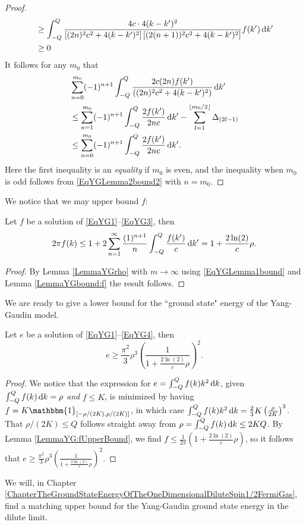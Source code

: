 \begin{proof}
\begin{equation}
\begin{aligned}
&\geq \int_{-Q}^{Q}\frac{4c\cdot 4(k-k')^2}{\left[(2n)^2c^2+4(k-k')^2\right]\left[(2(n+1))^2c^2+4(k-k')^2\right]} f(k')\mathop{}\!\mathrm{d} k'\\
&\geq 0
\end{aligned}
\end{equation}
It follows for any $ m_0 $ that \begin{equation}
\begin{aligned}
&\sum_{n=0}^{m_0}(-1)^{n+1}\int_{-Q}^{Q}\frac{2c(2n) f(k')}{((2n)^2c^2+4(k-k')^2)}\mathop{}\!\mathrm{d} k'\\
&\leq\sum_{n=1}^{m_0}(-1)^{n+1}\int_{-Q}^{Q}\frac{2 f(k')}{2nc}\mathop{}\!\mathrm{d} k'-\sum_{l=1}^{\left\lfloor m_0/2 \right\rfloor}\Delta_{(2l-1)}
\\
&\leq \sum_{n=0}^{m_0}(-1)^{n+1}\int_{-Q}^{Q}\frac{2 f(k')}{2nc}\mathop{}\!\mathrm{d} k'.
\end{aligned}
\end{equation}
Here the first inequality is an \emph{equality} if $ m_0 $ is even, and the inequality when $ m_0 $ is odd follows from \eqref{EqYGLemma2bound2} with $ n=m_0 $.
\end{proof}
 We notice that we may upper bound $ f $:
 \begin{lemma}\label{LemmaYG:fUpperBound}
 	Let $ f $ be a solution of \eqref{EqYG1}--\eqref{EqYG3}, then
 	\begin{equation}
 	\begin{aligned}
 	2\pi  f(k) \leq 1+2\sum_{n=1}^{\infty}\frac{(1)^{n+1}}{n}\int_{-Q}^{Q}\frac{ f(k')}{c}\mathop{}\!\mathrm{d} k'=1+\frac{2\ln(2)}{c} \rho.
 	\end{aligned}
 	\end{equation}
 \end{lemma}
\begin{proof}
	By Lemma \ref{LemmaYGrho} with $ m\to\infty $ using \eqref{EqYGLemma1bound} and Lemma \ref{LemmaYGbound:f} the result follows. 
\end{proof}
We are ready to give a lower bound for the ``ground state" energy of the Yang-Gaudin model. 
\begin{proposition}\label{PropositionYGLowerBound}
	Let $ e $ be a solution of \eqref{EqYG1}--\eqref{EqYG4}, then\begin{equation}
	e\geq \frac{\pi^2}{3}\rho ^3\left(\frac{1}{1+\frac{2\ln(2)}{c}\rho}\right)^2.
	\end{equation}
\end{proposition}
\begin{proof}
	We notice that the expression for $ e=\int_{-Q}^{Q}f(k)k^2\mathop{}\!\mathrm{d} k $, given $ \int_{-Q}^{Q}f(k)\mathop{}\!\mathrm{d} k=\rho $ \emph{and} $ f\leq K $, is minimized by having $ f=K\mathbbm{1}_{[-\rho/(2K),\rho /(2K)]} $, in which case $ \int_{-Q}^{Q}f(k)k^2\mathop{}\!\mathrm{d} k=\frac{2}{3}K\left(\frac{\rho}{2K}\right)^3 $. That $ \rho/(2K)\leq Q $ follows straight away from $ \rho =\int_{-Q}^{Q}f(k)\mathop{}\!\mathrm{d} k \leq 2KQ $.
	By Lemma \ref{LemmaYG:fUpperBound}, we find $ f\leq \frac{1}{2\pi}\left(1+\frac{2\ln(2)}{c}\rho\right) $, so it follows that $ e\geq \frac{\pi^2}{3}\rho ^3\left(\frac{1}{1+\frac{2\ln(2)}{c}\rho}\right)^2 $.
\end{proof}
We will, in Chapter \ref{ChapterTheGroundStateEnergyOfTheOneDimensionalDiluteSpin1/2FermiGas}, find a matching upper bound for the Yang-Gaudin ground state energy in the dilute limit.
